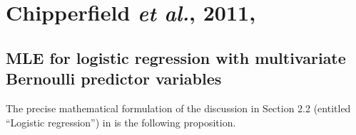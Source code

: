 

\section{Chipperfield \textit{et al.}, 2011, \cite{Chipperfield2011}}
\setcounter{theorem}{0}
\setcounter{equation}{0}

\renewcommand{\theenumi}{\roman{enumi}}
\renewcommand{\labelenumi}{\textnormal{(\theenumi)}$\;\;$}


\subsection{MLE for logistic regression with multivariate Bernoulli predictor variables}

The precise mathematical formulation of the discussion in
Section 2.2 (entitled ``Logistic regression'') in \cite{Chipperfield2011}
is the following proposition.

